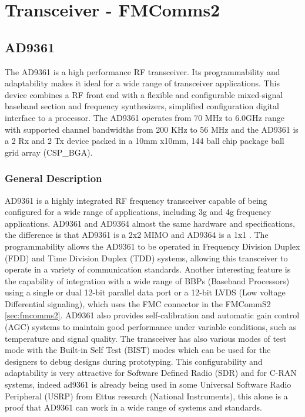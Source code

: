 \section{Transceiver - FMComms2}
\subsection{AD9361}
\label{sec:ad9361}

The AD9361 is a high performance RF transceiver. Its programmability and
adaptability makes it ideal for a wide range of transceiver applications. This
device combines a RF front end with a flexible and configurable mixed-signal
baseband section and frequency synthesizers, simplified configuration digital
interface to a processor. The AD9361 operates from 70 MHz to 6.0GHz range with
supported channel bandwidths from 200 KHz to 56 MHz and the AD9361 is a 2 Rx and
2 Tx device packed in a 10mm x10mm, 144 ball chip package ball grid array
(CSP\_BGA).

\subsubsection{General Description}

AD9361 is a highly integrated RF frequency transceiver capable of being
configured for a wide range of applications, including 3g and 4g frequency
applications. AD9361 and AD9364 almost the same hardware and specifications, the
difference is that AD9361 is a 2x2 MIMO and AD9364 is a 1x1 \cite{ad9361_wiki}.
The programmability allows the AD9361 to be operated in Frequency Division
Duplex (FDD) and Time Division Duplex (TDD) systems, allowing this transceiver
to operate in a variety of communication standards. Another interesting feature
is the capability of integration with a wide range of BBPs (Baseband Processors)
using a single or dual 12-bit parallel data port or a 12-bit LVDS (Low voltage
Differential signaling), which uses the FMC connector in the FMCommS2
\ref{sec:fmcomms2}. AD9361 also provides self-calibration and automatic gain
control (AGC) systems to maintain good performance under variable conditions,
such as temperature and signal quality. The transceiver has also various modes
of test mode with the Built-in Self Test (BIST) modes which can be used for the
designers to debug designs during prototyping. This configurability and
adaptability is very attractive for Software Defined Radio (SDR) and for C-RAN
systems, indeed ad9361 is already being used in some Universal Software Radio
Peripheral (USRP) from Ettus research (National Instruments), this alone is a
proof that AD9361 can work in a wide range of systems and standards.

